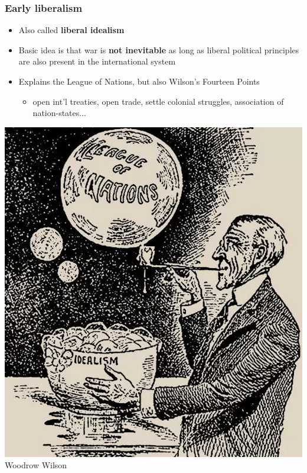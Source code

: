 \documentclass[aspectratio=43]{beamer}
\begin{document}
\begin{frame}
\frametitle{Early liberalism}
\centering

\begin{minipage}{.58\textwidth}\centering
\begin{itemize}
  \item Also called \textbf{liberal idealism}
  \item Basic idea is that war is \textbf{not inevitable} as long as liberal political principles are also present in the international system
  \item Explains the League of Nations, but also Wilson's Fourteen Points
  \begin{itemize}
    \item open int'l treaties, open trade, settle colonial struggles, association of nation-states...
  \end{itemize}
\end{itemize}
\end{minipage}\hfill
\begin{minipage}{.39\textwidth}\centering
\includegraphics[width = \textwidth]{img/wwilson}\\{\small Woodrow Wilson}
\end{minipage}

\end{frame}
\end{document}
